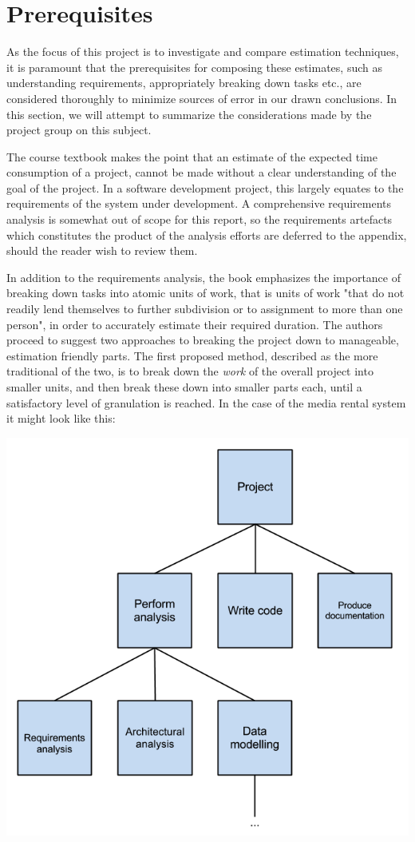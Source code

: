 \section{Prerequisites}
As the focus of this project is to investigate and compare estimation techniques, it is paramount that the prerequisites for composing these estimates, such as understanding requirements, appropriately breaking down tasks etc., are considered thoroughly to minimize sources of error in our drawn conclusions. In this section, we will attempt to summarize the considerations made by the project group on this subject.

The course textbook makes the point that an estimate of the expected time consumption of a project, cannot be made without a clear understanding of the goal of the project. In a software development project, this largely equates to the requirements of the system under development. A comprehensive requirements analysis is somewhat out of scope for this report, so the requirements artefacts which constitutes the product of the analysis efforts are deferred to the appendix, should the reader wish to review them.

In addition to the requirements analysis, the book emphasizes the importance of breaking down tasks into atomic units of work, that is units of work "that do not readily lend themselves to further subdivision or to assignment to more than one person", in order to accurately estimate their required duration. The authors proceed to suggest two approaches to breaking the project down to manageable, estimation friendly parts. The first proposed method, described as the more traditional of the two, is to break down the \textit{work} of the overall project into smaller units, and then break these down into smaller parts each, until a satisfactory level of granulation is reached. In the case of the media rental system it might look like this:

\begin{center}
\includegraphics[scale=0.5]{TaskBreakdown.png}
\end{center}

